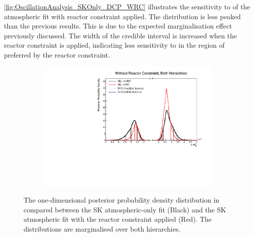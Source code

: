 \autoref{fig:OscillationAnalysis_SKOnly_DCP_WRC} illustrates the sensitivity to  of the atmospheric fit with reactor constraint applied. The distribution is less peaked than the previous results. This is due to the expected marginalisation effect previously discussed. The width of the \quickmath{1\sigma} credible interval is increased when the reactor constraint is applied, indicating less sensitivity to  in the region of  preferred by the reactor constraint.
\fi

\begin{figure}[h]
  \begin{subfigure}[t]{0.98\textwidth}
    \includegraphics[width=\textwidth, trim={0mm 0mm 0mm 0mm}, clip,page=1]{Figures/OA/SKOnlyFit_wRC/ContourComparison_1D_dm32_BH_2_wRC_woRC_UnSmeared_CredibleInterval.pdf}
  \end{subfigure}
  \caption{The one-dimensional posterior probability density distribution in  compared between the SK atmospheric-only fit (Black) and the SK atmospheric fit with the reactor constraint applied (Red). The distributions are marginalised over both hierarchies.}
  \label{fig:OscillationAnalysis_SKOnly_DELM32_WRC}
\end{figure}

